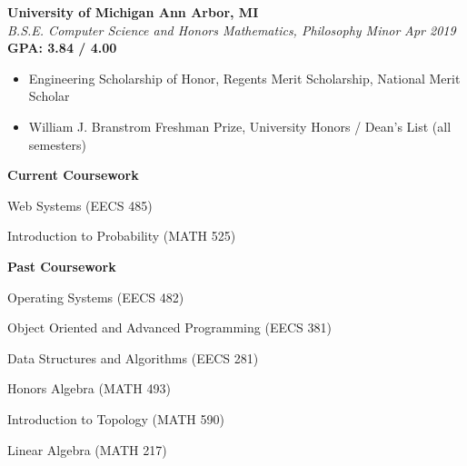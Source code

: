 \documentclass[margin,line]{resume}
\begin{document}
\begin{resume}
	\textbf{University of Michigan \hfill Ann Arbor, MI} \\\vspace{1mm}%
	\textsl{B.S.E. Computer Science and Honors Mathematics, Philosophy Minor} \hfill \textsl{Apr 2019}\vspace{-1mm}\\
	\textbf{GPA: 3.84 / 4.00} \\\vspace{-2.5mm}%
	\begin{itemize}[leftmargin=4mm]
		\item Engineering Scholarship of Honor, Regents Merit Scholarship, National Merit Scholar
		\item William J. Branstrom Freshman Prize, University Honors / Dean's List (all semesters)
	\end{itemize}
	\vspace{-5mm}
	\begin{center} \textbf{Current Coursework} \end{center}
	\vspace{-3mm}
	\small
	\begin{itemize}[leftmargin=4mm]
		\begin{minipage}[t]{.6\linewidth}
			\item Web Systems (EECS 485)
		\end{minipage}%
		\begin{minipage}[t]{.5\linewidth}
			\item Introduction to Probability (MATH 525)
		\end{minipage}%
	\end{itemize}
	\normalsize
	\vspace{-8mm}
	\begin{center} \textbf{Past Coursework} \end{center}
	\vspace{-3mm}
	\small
	\begin{itemize}[leftmargin=4mm]
		\begin{minipage}[t]{.6\linewidth}
			\item Operating Systems (EECS 482)
			\item Object Oriented and Advanced Programming (EECS 381)
			\item Data Structures and Algorithms (EECS 281)
		\end{minipage}%
		\begin{minipage}[t]{.5\linewidth}
			\item Honors Algebra (MATH 493)
			\item Introduction to Topology (MATH 590)
			\item Linear Algebra (MATH 217)
		\end{minipage}%
	\end{itemize}
	\normalsize
	\sectionbreak
	\vspace{-2.5mm}

\end{resume}
\end{document}
